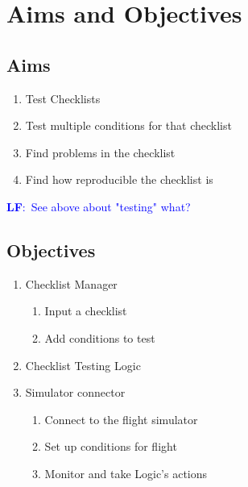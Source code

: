 \documentclass[a4paper]{article}
\newcommand{\lfcomment}[1]{\textcolor{blue}{\textbf{LF}:~#1}}
\begin{document}
\section{Aims and Objectives}
\subsection*{Aims}
\begin{enumerate}
    \item Test Checklists
    \item Test multiple conditions for that checklist
    \item Find problems in the checklist
    \item Find how reproducible the checklist is
\end{enumerate}

\lfcomment{See above about "testing" what?}

\subsection*{Objectives}
\begin{enumerate}
    \item Checklist Manager
    \begin{enumerate}
        \item Input a checklist
        \item Add conditions to test        
    \end{enumerate}
    \item Checklist Testing Logic
    \item Simulator connector
    \begin{enumerate}
        \item Connect to the flight simulator
        \item Set up conditions for flight
        \item Monitor and take Logic's actions
    \end{enumerate}
\end{enumerate}
\end{document}
